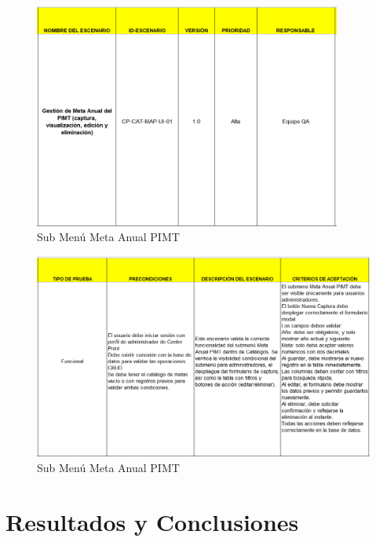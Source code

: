 \documentclass[12pt,letterpaper,spanish, xcolor=table]{report}
\numberwithin{figure}{subsection}
\begin{document}
	\begin{figure}[H]
		\centering
		\includegraphics[width=0.9\textwidth]
		{Imagenes/CenterPoint/EMeta.png}
		\caption{Sub Menú Meta Anual PIMT}\label{a3}
	\end{figure}
	
	\begin{figure}[H]
		\centering
		\includegraphics[width=1.0\textwidth]
		{Imagenes/CenterPoint/EMeta2.png}
		\caption{Sub Menú Meta Anual PIMT}\label{a3}
	\end{figure}
	
	
	
	
	
\chapter{Resultados y Conclusiones}
\newpage
	
\end{document}
